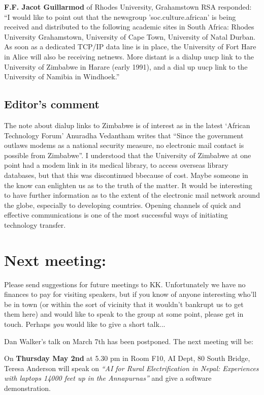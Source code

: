 {\bf F.F. Jacot Guillarmod} of Rhodes University, Grahamstown RSA responded:\\
``I would like to point out that the newsgroup 'soc.culture.african' is
being received and distributed to the following academic sites in
South Africa: Rhodes University Grahamstown, University of Cape Town,
University of Natal Durban. 
As soon as a dedicated TCP/IP data line is in place, the University of
Fort Hare in Alice will also be receiving netnews.  More distant is a
dialup uucp link to the University of Zimbabwe in Harare (early 1991),
and a dial up uucp link to the University of Namibia in Windhoek.''

\subsection{Editor's comment}
The note
about dialup links to Zimbabwe is of interest as in the latest
`African Technology Forum' Anuradha Vedantham writes that ``Since the
government outlaws modems as a national security measure, no
electronic mail contact is possible from Zimbabwe''. I understood that
the University of Zimbabwe at one point had a modem link in its
medical library, to access overseas library databases, but that this
was discontinued bbecause of cost. Maybe someone in the know can
enlighten us as to the truth of the matter. It would be 
interesting to have further information as to the extent of the
electronic mail network around the globe, especially to developing
countries. Opening channels of quick and effective communications is
one of the most successful ways of initiating technology transfer.

\section{Next meeting:}
Please send suggestions for future meetings to KK. Unfortunately we
have no finances to pay for visiting speakers, but if you know of
anyone interesting who'll be in town (or within the sort of vicinity
that it wouldn't bankrupt us to get them here) and would like to speak
to the group at some point, please get in touch. Perhaps {\em you}
would like to give a short talk...

Dan Walker's talk on March 7th has been postponed. The next meeting
will be:

On {\bf Thursday May 2nd}
at 5.30 pm in Room F10, AI Dept, 80 South Bridge,
Teresa Anderson will speak on {\em ``AI for Rural Electrification in Nepal:
Experiences with laptops 14000 feet up in the Annapurnas''}  and give
a software demonstration. 

